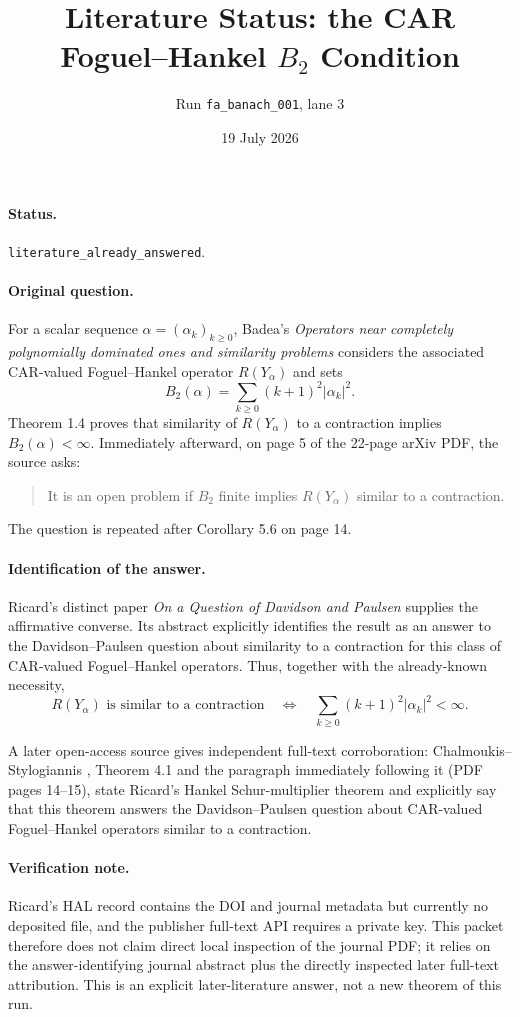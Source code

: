 \documentclass[11pt]{article}
\title{Literature Status: the CAR Foguel--Hankel $B_2$ Condition}
\author{Run \texttt{fa\_banach\_001}, lane 3}
\date{19 July 2026}
\begin{document}
\maketitle

\paragraph{Status.}
\texttt{literature\_already\_answered}.

\paragraph{Original question.}
For a scalar sequence $\alpha=(\alpha_k)_{k\geq0}$, Badea's
\emph{Operators near completely polynomially dominated ones and similarity
problems} \cite{Badea} considers the associated CAR-valued Foguel--Hankel
operator $R(Y_\alpha)$ and sets
\[
 B_2(\alpha)=\sum_{k\geq0}(k+1)^2|\alpha_k|^2.
\]
Theorem 1.4 proves that similarity of $R(Y_\alpha)$ to a contraction implies
$B_2(\alpha)<\infty$.  Immediately afterward, on page 5 of the 22-page arXiv
PDF, the source asks:
\begin{quote}
It is an open problem if $B_2$ finite implies $R(Y_\alpha)$ similar to a
contraction.
\end{quote}
The question is repeated after Corollary 5.6 on page 14.

\paragraph{Identification of the answer.}
Ricard's distinct paper \emph{On a Question of Davidson and Paulsen}
\cite{Ricard} supplies the affirmative converse.  Its abstract explicitly
identifies the result as an answer to the Davidson--Paulsen question about
similarity to a contraction for this class of CAR-valued Foguel--Hankel
operators.  Thus, together with the already-known necessity,
\[
 R(Y_\alpha)\text{ is similar to a contraction}
 \quad\Longleftrightarrow\quad
 \sum_{k\geq0}(k+1)^2|\alpha_k|^2<\infty.
\]

A later open-access source gives independent full-text corroboration:
Chalmoukis--Stylogiannis \cite{CS}, Theorem 4.1 and the paragraph immediately
following it (PDF pages 14--15), state Ricard's Hankel Schur-multiplier theorem
and explicitly say that this theorem answers the Davidson--Paulsen question
about CAR-valued Foguel--Hankel operators similar to a contraction.

\paragraph{Verification note.}
Ricard's HAL record contains the DOI and journal metadata but currently no
deposited file, and the publisher full-text API requires a private key.  This
packet therefore does not claim direct local inspection of the journal PDF;
it relies on the answer-identifying journal abstract plus the directly
inspected later full-text attribution.  This is an explicit later-literature
answer, not a new theorem of this run.
\end{document}
